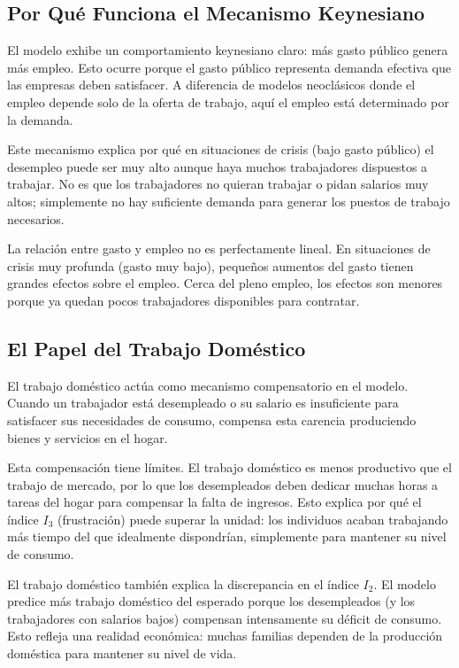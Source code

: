\subsection{Por Qué Funciona el Mecanismo Keynesiano}

El modelo exhibe un comportamiento keynesiano claro: más gasto público genera más empleo. Esto ocurre porque el gasto público representa demanda efectiva que las empresas deben satisfacer. A diferencia de modelos neoclásicos donde el empleo depende solo de la oferta de trabajo, aquí el empleo está determinado por la demanda.

Este mecanismo explica por qué en situaciones de crisis (bajo gasto público) el desempleo puede ser muy alto aunque haya muchos trabajadores dispuestos a trabajar. No es que los trabajadores no quieran trabajar o pidan salarios muy altos; simplemente no hay suficiente demanda para generar los puestos de trabajo necesarios.

La relación entre gasto y empleo no es perfectamente lineal. En situaciones de crisis muy profunda (gasto muy bajo), pequeños aumentos del gasto tienen grandes efectos sobre el empleo. Cerca del pleno empleo, los efectos son menores porque ya quedan pocos trabajadores disponibles para contratar.

\subsection{El Papel del Trabajo Doméstico}

El trabajo doméstico actúa como mecanismo compensatorio en el modelo. Cuando un trabajador está desempleado o su salario es insuficiente para satisfacer sus necesidades de consumo, compensa esta carencia produciendo bienes y servicios en el hogar.

Esta compensación tiene límites. El trabajo doméstico es menos productivo que el trabajo de mercado, por lo que los desempleados deben dedicar muchas horas a tareas del hogar para compensar la falta de ingresos. Esto explica por qué el índice $I_3$ (frustración) puede superar la unidad: los individuos acaban trabajando más tiempo del que idealmente dispondrían, simplemente para mantener su nivel de consumo.

El trabajo doméstico también explica la discrepancia en el índice $I_2$. El modelo predice más trabajo doméstico del esperado porque los desempleados (y los trabajadores con salarios bajos) compensan intensamente su déficit de consumo. Esto refleja una realidad económica: muchas familias dependen de la producción doméstica para mantener su nivel de vida.

